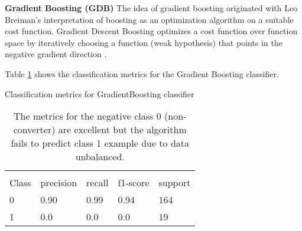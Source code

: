 \documentclass[11pt]{article}
\theoremstyle{definition}
\theoremstyle{remark}
\begin{document}
%


\textbf{Gradient Boosting (GDB)}
The idea of gradient boosting originated with Leo Breiman's interpretation of boosting as an optimization algorithm on a suitable cost function. Gradient Descent Boosting optimizes a cost function over function space by iteratively choosing a function (weak hypothesis) that points in the negative gradient direction \cite{friedman2001greedy}. 

Table \ref{tab:gbc} shows the classification metrics for the Gradient Boosting classifier.
\begin{table}[H]
\caption{Classification metrics for GradientBoosting classifier} 
\begin{center} 
\begin{tabular}{lllll}
\hline
\multicolumn{1}{c}{} \\
Class & precision & recall & f1-score & support     \\
\hline
0 & 0.90  &    0.99   &   0.94   &  164 \\
1 & 0.0  &    0.0   &   0.0   &   19 \\
\hline
\end{tabular}
\caption{The metrics for the negative class 0 (non-converter) are excellent but the algorithm fails to predict class 1 example due to data unbalanced.
} \label{tab:gbc} 
\end{center}
\end{table}
\end{document}
